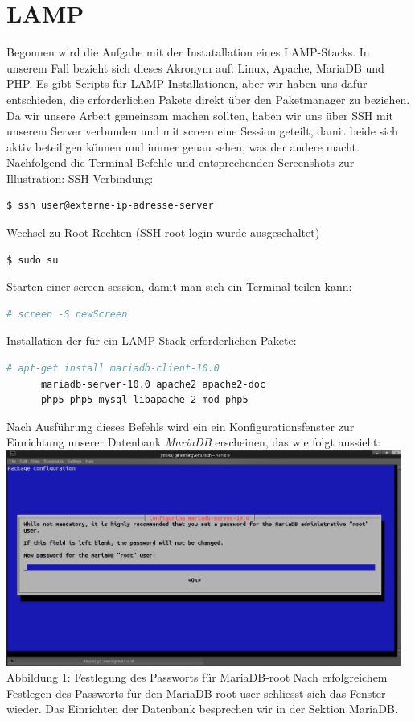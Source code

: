 \documentclass{article}
\begin{document}
	\section{LAMP}
	Begonnen wird die Aufgabe mit der Instatallation eines LAMP-Stacks. In unserem Fall bezieht sich dieses Akronym auf: Linux, Apache, MariaDB und PHP. Es gibt Scripts für LAMP-Installationen, aber wir haben uns dafür entschieden, die erforderlichen Pakete direkt über den Paketmanager zu beziehen. Da wir unsere Arbeit gemeinsam machen sollten, haben wir uns über SSH mit unserem Server verbunden und mit screen eine Session geteilt, damit beide sich aktiv beteiligen können und immer genau sehen, was der andere macht. Nachfolgend die Terminal-Befehle und entsprechenden Screenshots zur Illustration:
	\linebreak
	SSH-Verbindung:
	\begin{lstlisting}[language=bash]
	$ ssh user@externe-ip-adresse-server
	\end{lstlisting}
	Wechsel zu Root-Rechten (SSH-root login wurde ausgeschaltet)
	\begin{lstlisting}[language=bash]
	$ sudo su
	\end{lstlisting}
	Starten einer screen-session, damit man sich ein Terminal teilen kann:
	\begin{lstlisting}[language=bash]
	# screen -S newScreen
	\end{lstlisting}
	Installation der für ein LAMP-Stack erforderlichen Pakete:
	\begin{lstlisting}[language=bash]
	# apt-get install mariadb-client-10.0
	  mariadb-server-10.0 apache2 apache2-doc 
	  php5 php5-mysql libapache 2-mod-php5
	\end{lstlisting}
	Nach Ausführung dieses Befehls wird ein ein Konfigurationsfenster zur Einrichtung unserer Datenbank \textit{MariaDB} erscheinen, das wie folgt aussieht:
	\newline
	\newline
	\includegraphics[width=13cm]{../Pics/3-lamp-stack-mariadb}
	Abbildung 1: Festlegung des Passworts für MariaDB-root
	\newline
	\newline
	Nach erfolgreichem Festlegen des Passworts für den MariaDB-root-user schliesst sich das Fenster wieder. Das Einrichten der Datenbank besprechen wir in der Sektion MariaDB.
\end{document}
